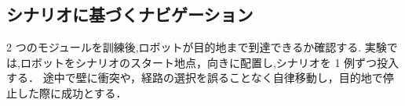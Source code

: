 \clearpage
\subsection{シナリオに基づくナビゲーション}
2 つのモジュールを訓練後,ロボットが目的地まで到達できるか確認する.
実験では,ロボットをシナリオのスタート地点，向きに配置し,シナリオを 1 例ずつ投入する．
途中で壁に衝突や，経路の選択を誤ることなく自律移動し，目的地で停止した際に成功とする．